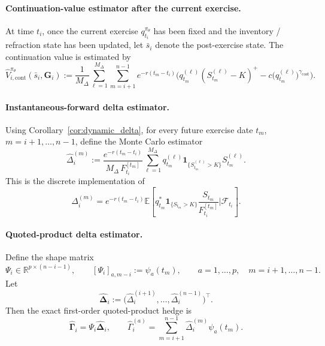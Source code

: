 \documentclass[10pt,a4paper,reqno]{amsart}
\newcommand{\<}{\langle}
\renewcommand{\>}{\rangle}
\theoremstyle{example}
\begin{document}
\paragraph{Continuation-value estimator after the current exercise.}
At time $t_i$, once the current exercise $q_{t_i}^{\pi_\theta}$ has been fixed and the inventory / refraction
state has been updated, let $\bar s_i$ denote the post-exercise state. The continuation value is estimated by
\begin{equation}
\label{eq:continuation_value_estimator_impl}
\widehat{V}_{i,\mathrm{cont}}^{\pi_\theta}(\bar s_i,\mathbf{G}_i)
:=
\frac{1}{M_\Delta}
\sum_{\ell=1}^{M_\Delta}
\sum_{m=i+1}^{n-1}
e^{-r(t_m-t_i)}
\Big(
q_{t_m}^{(\ell)}(S_{t_m}^{(\ell)}-K)^+
-
c \big(q_{t_m}^{(\ell)}\big)^{\gamma_{\mathrm{cost}}}
\Big).
\end{equation}

\paragraph{Instantaneous-forward delta estimator.}
Using Corollary~\ref{cor:dynamic_delta}, for every future exercise date $t_m$, $m=i+1,\dots,n-1$, define
the Monte Carlo estimator
\begin{equation}
\label{eq:delta_mc_estimator_impl}
\widehat{\Delta}_i^{(m)}
:=
\frac{e^{-r(t_m-t_i)}}{M_\Delta\,F_{t_i}^{[t_m]}}
\sum_{\ell=1}^{M_\Delta}
q_{t_m}^{(\ell)}
\mathbf{1}_{\{S_{t_m}^{(\ell)}>K\}}
S_{t_m}^{(\ell)}.
\end{equation}
This is the discrete implementation of
\[
\Delta_i^{(m)}
=
e^{-r(t_m-t_i)}
\mathbb{E}\!\left[
q_{t_m}^*
\mathbf{1}_{\{S_{t_m}>K\}}
\frac{S_{t_m}}{F_{t_i}^{[t_m]}}
\Bigg|
\mathcal{F}_{t_i}
\right].
\]

\paragraph{Quoted-product delta estimator.}
Define the shape matrix
\begin{equation}
\label{eq:shape_matrix_impl}
\Psi_i
\in \mathbb{R}^{p\times(n-i-1)},
\qquad
[\Psi_i]_{a,m-i}
:=
\psi_a(t_m),
\qquad
a=1,\dots,p,\quad m=i+1,\dots,n-1.
\end{equation}
Let
\[
\widehat{\boldsymbol{\Delta}}_i
:=
\big(
\widehat{\Delta}_i^{(i+1)},\dots,\widehat{\Delta}_i^{(n-1)}
\big)^\top.
\]
Then the exact first-order quoted-product hedge is
\begin{equation}
\label{eq:quoted_delta_mc_impl}
\widehat{\boldsymbol{\Gamma}}_i
=
\Psi_i \widehat{\boldsymbol{\Delta}}_i,
\qquad
\widehat{\Gamma}_i^{(a)}
=
\sum_{m=i+1}^{n-1}
\widehat{\Delta}_i^{(m)}\psi_a(t_m).
\end{equation}
\end{document}
